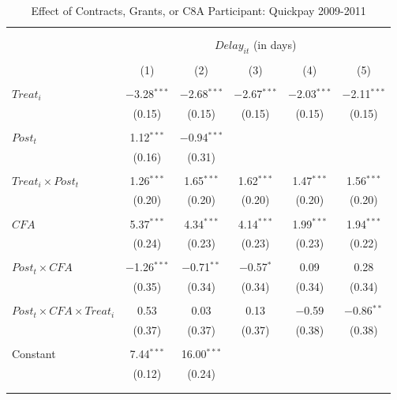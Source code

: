 \documentclass[
]{article}
\begin{document}
\begin{table}[H] \centering 
  \caption{Effect of Contracts, Grants, or C8A Participant: Quickpay 2009-2011} 
  \label{} 
\small 
\begin{tabular}{@{\extracolsep{-2pt}}lccccc} 
\\[-1.8ex]\hline 
\hline \\[-1.8ex] 
\\[-1.8ex] & \multicolumn{5}{c}{$Delay_{it}$ (in days)} \\ 
\\[-1.8ex] & (1) & (2) & (3) & (4) & (5)\\ 
\hline \\[-1.8ex] 
 $Treat_i$ & $-$3.28$^{***}$ & $-$2.68$^{***}$ & $-$2.67$^{***}$ & $-$2.03$^{***}$ & $-$2.11$^{***}$ \\ 
  & (0.15) & (0.15) & (0.15) & (0.15) & (0.15) \\ 
  & & & & & \\ 
 $Post_t$ & 1.12$^{***}$ & $-$0.94$^{***}$ &  &  &  \\ 
  & (0.16) & (0.31) &  &  &  \\ 
  & & & & & \\ 
 $Treat_i \times Post_t$ & 1.26$^{***}$ & 1.65$^{***}$ & 1.62$^{***}$ & 1.47$^{***}$ & 1.56$^{***}$ \\ 
  & (0.20) & (0.20) & (0.20) & (0.20) & (0.20) \\ 
  & & & & & \\ 
 $CFA$ & 5.37$^{***}$ & 4.34$^{***}$ & 4.14$^{***}$ & 1.99$^{***}$ & 1.94$^{***}$ \\ 
  & (0.24) & (0.23) & (0.23) & (0.23) & (0.22) \\ 
  & & & & & \\ 
 $Post_t \times CFA$ & $-$1.26$^{***}$ & $-$0.71$^{**}$ & $-$0.57$^{*}$ & 0.09 & 0.28 \\ 
  & (0.35) & (0.34) & (0.34) & (0.34) & (0.34) \\ 
  & & & & & \\ 
 $Post_t \times CFA \times Treat_i$ & 0.53 & 0.03 & 0.13 & $-$0.59 & $-$0.86$^{**}$ \\ 
  & (0.37) & (0.37) & (0.37) & (0.38) & (0.38) \\ 
  & & & & & \\ 
 Constant & 7.44$^{***}$ & 16.00$^{***}$ &  &  &  \\ 
  & (0.12) & (0.24) &  &  &  \\ 
  & & & & & \\ 
\hline \\[-1.8ex] 

\end{tabular}
\end{table}
\end{document}
